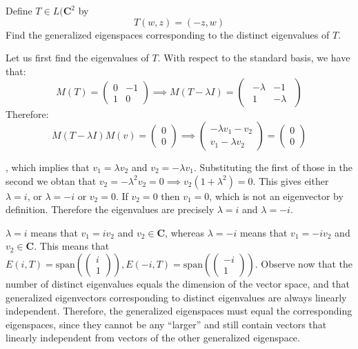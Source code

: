  \begin{exercise}{2}
     Define $T \in L(\mathbf{C}^2$ by
     $$T(w, z) = (-z, w)$$
     Find the generalized eigenspaces corresponding to the distinct eigenvalues of $T$.
 \end{exercise}

 \begin{solution}
 
     Let us first find the eigenvalues of $T$. With respect to the standard basis, we have that:
     $$M(T) = \begin{pmatrix}
         0 & -1 \\ 1 & 0
     \end{pmatrix} \implies M(T - \lambda I) = \begin{pmatrix} \begin{array} {rr}
         -\lambda & -1 \\ 1 & -\lambda \end{array} \end{pmatrix}$$
    Therefore:
    $$M(T - \lambda I)M(v) = \begin{pmatrix} 0 \\ 0 \end{pmatrix} \implies \begin{pmatrix}
        -\lambda v_1 - v_2 \\ v_1 - \lambda v_2
    \end{pmatrix} = \begin{pmatrix} 0 \\ 0 \end{pmatrix} $$

    , which implies that $v_1 = \lambda v_2$ and $v_2 = -\lambda v_1$. Substituting the first of those in the second we obtan that $v_2 = -\lambda^2 v_2 = 0 \implies v_2(1 + \lambda^2) = 0$. This gives either $\lambda = i$, or $\lambda = -i$ or $v_2 = 0$. If $v_2 = 0$ then $v_1 = 0$, which is not an eigenvector by definition. Therefore the eigenvalues are precisely $\lambda = i$ and $\lambda = -i$.

    $\lambda = i$ means that $v_1 = i v_2$ and $v_2 \in \mathbf{C}$, whereas $\lambda = -i$ means that $v_1 = -i v_2$ and $v_2 \in \mathbf{C}$. This means that $E(i, T) = \text{span}\left( \begin{pmatrix}
        i \\ 1
    \end{pmatrix} \right), E(-i, T) = \text{span}\left( \begin{pmatrix}
        -i \\ 1
    \end{pmatrix} \right)$. Observe now that the number of distinct eigenvalues equals the dimension of the vector space, and that generalized eigenvectors corresponding to distinct eigenvalues are always linearly independent. Therefore, the generalized eigenspaces must equal the corresponding eigenspaces, since they cannot be any ``larger'' and still contain vectors that linearly independent from vectors of the other generalized eigenspace.
 \end{solution}

